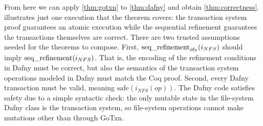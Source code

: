 From here we can apply \cref{thm:gotxn} to \cref{thm:dafny} and
obtain \cref{thm:correctness}.  illustrates
just one execution that the theorem covers: the transaction system proof guarantees an
atomic execution while the sequential refinement guarantees the transactions
themselves are correct. There are two trusted assumptions needed for the
theorems to compose. First, $\operatorname{seq\_refinement}_{\mathrm{dfy}}(i_{NFS})$ should imply
$\operatorname{seq\_refinement}(i_{NFS})$. That is, the encoding of the refinement
conditions in Dafny must be correct, but also the semantics of the transaction
system operations modeled in Dafny must match the Coq proof. Second, every Dafny
transaction must be valid, meaning $\mathrm{safe}(i_{NFS}(op))$. The Dafny code
satisfies safety due to a simple syntactic check: the only mutable state in the
file-system Dafny class is the transaction system, so file-system operations
cannot make mutations other than through GoTxn.

